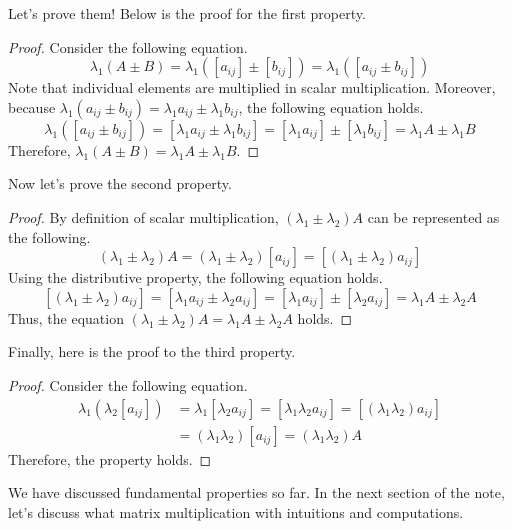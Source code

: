 \documentclass[../../main.tex]{subfiles}
\begin{document}
Let's prove them! Below is the proof for the first property.

\begin{proof}
Consider the following equation.
\[
\lambda_1 (A \pm B)
= \lambda_1 ([a_{ij}] \pm [b_{ij}])
= \lambda_1 ([a_{ij} \pm b_{ij}])
\]
Note that individual elements are multiplied in scalar multiplication.
Moreover, because $\lambda_1 (a_{ij} \pm b_{ij}) = \lambda_1 a_{ij}
\pm \lambda_1 b_{ij}$, the following equation holds.
\[
\lambda_1 ([a_{ij} \pm b_{ij}])
= [\lambda_1 a_{ij} \pm \lambda_1 b_{ij}]
= [\lambda_1 a_{ij}] \pm [\lambda_1 b_{ij}]
= \lambda_1 A \pm \lambda_1 B
\]
Therefore, $\lambda_1 (A \pm B) = \lambda_1 A \pm \lambda_1 B$.
\end{proof}

Now let's prove the second property.

\begin{proof}
By definition of scalar multiplication, $(\lambda_1 \pm \lambda_2)
A$ can be represented as the following.
\[
(\lambda_1 \pm \lambda_2) A
= (\lambda_1 \pm \lambda_2) [a_{ij}]
= [(\lambda_1 \pm \lambda_2) a_{ij}]
\]
Using the distributive property, the following equation holds.
\[
[(\lambda_1 \pm \lambda_2) a_{ij}]
= [\lambda_1 a_{ij} \pm \lambda_2 a_{ij}]
= [\lambda_1 a_{ij}] \pm [\lambda_2 a_{ij}]
= \lambda_1 A \pm \lambda_2 A
\]
Thus, the equation $(\lambda_1 \pm \lambda_2) A =
\lambda_1 A \pm \lambda_2 A$ holds.
\end{proof}

Finally, here is the proof to the third property.

\begin{proof}
Consider the following equation.
\begin{align*}
    \lambda_1 (\lambda_2 [a_{ij}])
    &= \lambda_1 [\lambda_2 a_{ij}]
    = [\lambda_1 \lambda_2 a_{ij}]
    = [(\lambda_1 \lambda_2) a_{ij}] \\
    &= (\lambda_1 \lambda_2) [a_{ij}]
    = (\lambda_1 \lambda_2) A
\end{align*}
Therefore, the property holds.
\end{proof}

We have discussed fundamental properties so far. In the next
section of the note, let's discuss what matrix multiplication
with intuitions and computations.
\end{document}
